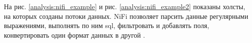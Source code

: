 \begin{figure}[ht!]
\end{figure}

На рис. \ref{analysis:nifi_example} и рис. \ref{analysis:nifi_example2}  показаны холсты, на которых созданы потоки данных.
NiFi позволяет парсить данные регулярными выражениями, выполнять по ним sql, 
фильтровать и добавлять поля, конвертировать один формат данных в другой \cite{bib11}. 

\begin{figure}[ht!]
\end{figure}

